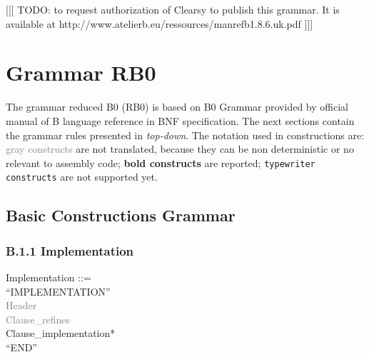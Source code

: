 \documentclass[12pt,a4paper,draft]{article}
\begin{document}


[[[ TODO: to request authorization of Clearsy to publish this grammar. It is available at http://www.atelierb.eu/ressources/manrefb1.8.6.uk.pdf ]]]

\section{ Grammar RB0}
The grammar reduced B0 (RB0)  is based on B0 Grammar  provided by official manual of B language reference in BNF specification. 
The next sections contain the grammar rules presented in \textit{top-down}. 
The notation used in constructions are:
\textcolor{gray}{gray constructs} are not translated, because they can be non deterministic or  no relevant to assembly code;
\textbf{bold constructs} are reported; \texttt{typewriter constructs} are not supported yet.

\subsection{Basic Constructions Grammar}

\subsubsection{ B.1.1 Implementation }
\footnotesize{
\begin{sloppypar} 
\noindent Implementation ::=\\
\hspace*{0.20in} ``IMPLEMENTATION''\\
\hspace*{0.20in} \textcolor{gray}{Header}\\
\hspace*{0.20in} \textcolor{gray}{Clause\_refines}\\
\hspace*{0.20in} Clause\_implementation*\\
\hspace*{0.20in} ``END'' \\
\end{sloppypar}}
\end{document}
